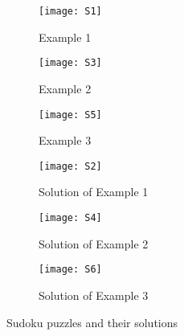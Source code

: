\documentclass[conference]{IEEEtran}
\begin{document}
\begin{figure}[H]
    \centering
    \setlength{\abovecaptionskip}{4pt}
    \setlength{\belowcaptionskip}{4pt}
    
    \begin{multicols}{2}  
    
    \begin{subfigure}{\linewidth}
        \centering
        \texttt{[image: S1]} 
        \caption{Example 1}
        \label{fig:s1}
    \end{subfigure}
    
    \begin{subfigure}{\linewidth}
        \centering
        \texttt{[image: S3]} 
        \caption{Example 2}
        \label{fig:s3}
    \end{subfigure}
    
    \begin{subfigure}{\linewidth}
        \centering
        \texttt{[image: S5]} 
        \caption{Example 3}
        \label{fig:s5}
    \end{subfigure}
    
    \columnbreak 
    
    \begin{subfigure}{\linewidth}
        \centering
        \texttt{[image: S2]} 
        \caption{Solution of Example 1}
        \label{fig:s2}
    \end{subfigure}
    
    \begin{subfigure}{\linewidth}
        \centering
        \texttt{[image: S4]} 
        \caption{Solution of Example 2}
        \label{fig:s4}
    \end{subfigure}
    
    \begin{subfigure}{\linewidth}
        \centering
        \texttt{[image: S6]} 
        \caption{Solution of Example 3}
        \label{fig:s6}
    \end{subfigure}
    
    \end{multicols}
    
    \caption{Sudoku puzzles and their solutions}
\end{figure}
\end{document}
